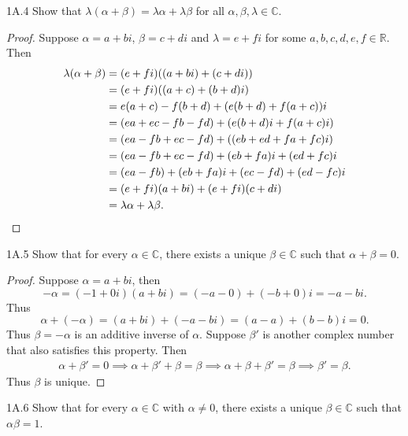 \documentclass{exam}
\begin{document}
\begin{problem}{1A.4}
    Show that $\lambda(\alpha + \beta) = \lambda\alpha + \lambda\beta$ for all $\alpha, \beta, \lambda\in\mathbb C$.
\end{problem}

\begin{proof}
    Suppose $\alpha = a + bi$, $\beta = c+di$ and $\lambda = e + fi$ for some $a,b,c,d,e,f\in\mathbb R$. Then
    \begin{align*}
        \lambda(\alpha + \beta) &= (e+fi)((a + bi) + (c + di))\\
        &=(e+fi)((a+c)+(b+d)i)\\
        &=e(a+c)-f(b+d) + (e(b + d) + f(a + c))i\\
        &=(ea + ec - fb - fd) + (e(b+d)i +  f(a + c)i)\\
        &=(ea - fb + ec - fd) + ((eb + ed + fa + fc)i)\\
        &= (ea - fb + ec - fd) + (eb + fa)i + (ed + fc)i\\
        &= (ea - fb) + (eb + fa)i + (ec - fd) + (ed - fc)i\\
        &= (e+fi)(a+bi)+(e+fi)(c+di)\\
        &= \lambda\alpha + \lambda\beta. \qedhere
    \end{align*}
\end{proof}

\begin{problem}{1A.5}
    Show that for every $\alpha\in\mathbb C$, there exists a unique $\beta\in\mathbb C$ such that $\alpha + \beta = 0$.
\end{problem}

\begin{proof}
    Suppose $\alpha = a + bi$, then $$-\alpha = (-1 + 0i)(a + bi) = (-a - 0) + (-b + 0)i = -a-bi.$$ Thus $$\alpha + (-\alpha) =  (a + bi) + (-a - bi) = (a - a) + (b - b)i = 0.$$ Thus $\beta = -\alpha$ is an additive inverse of $\alpha$. Suppose $\beta'$ is another complex number that also satisfies this property. Then
    \begin{align*}
        \alpha + \beta' = 0 \implies \alpha + \beta' + \beta = \beta \implies \alpha + \beta + \beta' = \beta \implies \beta' = \beta.
    \end{align*}
    Thus $\beta$ is unique.
\end{proof}

\begin{problem}{1A.6}
    Show that for every $\alpha\in\mathbb C$ with $\alpha\neq0$, there exists a unique $\beta \in \mathbb C$ such that $\alpha\beta=1$.
\end{problem}
\end{document}

